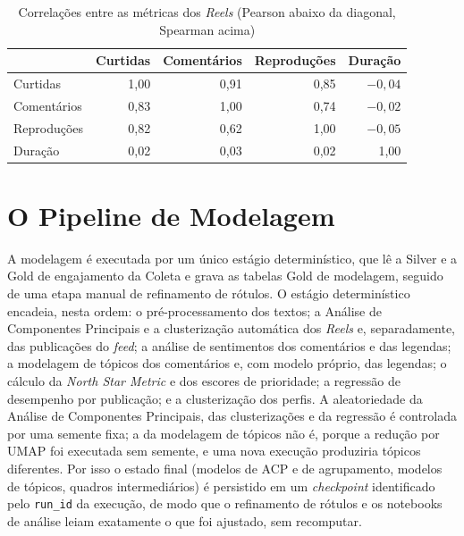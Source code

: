 \begin{table}[htb]
\centering
\caption{Correlações entre as métricas dos \emph{Reels} (Pearson abaixo da diagonal, Spearman acima)}
\label{tab:correlacao_reels}
\small
\begin{tabular}{lrrrr}
\toprule
 & \textbf{Curtidas} & \textbf{Comentários} & \textbf{Reproduções} & \textbf{Duração} \\
\midrule
Curtidas & 1,00 & 0,91 & 0,85 & $-0{,}04$ \\
Comentários & 0,83 & 1,00 & 0,74 & $-0{,}02$ \\
Reproduções & 0,82 & 0,62 & 1,00 & $-0{,}05$ \\
Duração & 0,02 & 0,03 & 0,02 & 1,00 \\
\bottomrule
\end{tabular}
\end{table}

\section{O Pipeline de Modelagem}\label{sec:pipeline-modelagem}

A modelagem é executada por um único estágio determinístico, que lê a Silver e a Gold de engajamento da Coleta e grava as tabelas Gold de modelagem, seguido de uma etapa manual de refinamento de rótulos. O estágio determinístico encadeia, nesta ordem: o pré-processamento dos textos; a Análise de Componentes Principais e a clusterização automática dos \emph{Reels} e, separadamente, das publicações do \emph{feed}; a análise de sentimentos dos comentários e das legendas; a modelagem de tópicos dos comentários e, com modelo próprio, das legendas; o cálculo da \emph{North Star Metric} e dos escores de prioridade; a regressão de desempenho por publicação; e a clusterização dos perfis. A aleatoriedade da Análise de Componentes Principais, das clusterizações e da regressão é controlada por uma semente fixa; a da modelagem de tópicos não é, porque a redução por UMAP foi executada sem semente, e uma nova execução produziria tópicos diferentes. Por isso o estado final (modelos de ACP e de agrupamento, modelos de tópicos, quadros intermediários) é persistido em um \emph{checkpoint} identificado pelo \texttt{run\_id} da execução, de modo que o refinamento de rótulos e os notebooks de análise leiam exatamente o que foi ajustado, sem recomputar.

